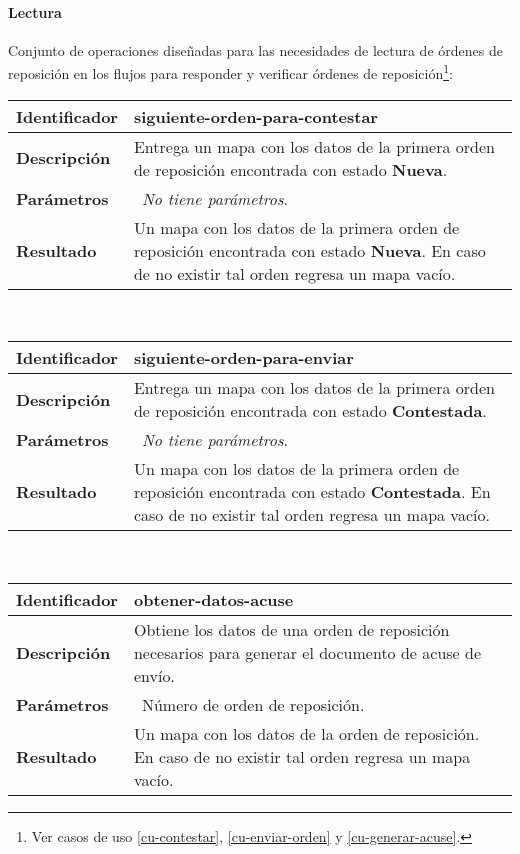 \paragraph{Lectura\\}
Conjunto de operaciones diseñadas para las necesidades de lectura de órdenes de reposición en los flujos para responder y verificar órdenes de reposición\footnote{Ver casos de uso \ref{cu-contestar}, \ref{cu-enviar-orden} y \ref{cu-generar-acuse}.}:
	\vspace{5mm}\\
	\begin{tabular}{|p{}|p{}|}
		\hline
		\textbf{Identificador}	& \textbf{siguiente-orden-para-contestar}\\
		\hline
		\hline
		\textbf{Descripción}	& Entrega un mapa con los datos de la primera orden de reposición encontrada con estado \textbf{Nueva}.\\
		\hline
		\textbf{Parámetros} 	& \textbullet\, \textit{No tiene parámetros}.\\
		\hline
		\textbf{Resultado}		& Un mapa con los datos de la primera orden de reposición encontrada con estado \textbf{Nueva}. En caso de no existir tal orden regresa un mapa vacío.\\
		\hline
	\end{tabular}
	\vspace{5mm}\\
	\begin{tabular}{|p{}|p{}|}
		\hline
		\textbf{Identificador}	& \textbf{siguiente-orden-para-enviar}\\
		\hline
		\hline
		\textbf{Descripción}	& Entrega un mapa con los datos de la primera orden de reposición encontrada con estado \textbf{Contestada}.\\
		\hline
		\textbf{Parámetros} 	& \textbullet\, \textit{No tiene parámetros}.\\
		\hline
		\textbf{Resultado}		& Un mapa con los datos de la primera orden de reposición encontrada con estado \textbf{Contestada}. En caso de no existir tal orden regresa un mapa vacío.\\
		\hline
	\end{tabular}
	\vspace{5mm}\\
	\begin{tabular}{|p{}|p{}|}
		\hline
		\textbf{Identificador}	& \textbf{obtener-datos-acuse}\\
		\hline
		\hline
		\textbf{Descripción}	& Obtiene los datos de una orden de reposición necesarios para generar el documento de acuse de envío.\\
		\hline
		\textbf{Parámetros}		& \textbullet\, Número de orden de reposición.\\
		\hline
		\textbf{Resultado}		& Un mapa con los datos de la orden de reposición. En caso de no existir tal orden regresa un mapa vacío.\\
		\hline
	\end{tabular}
	\vspace{5mm}

